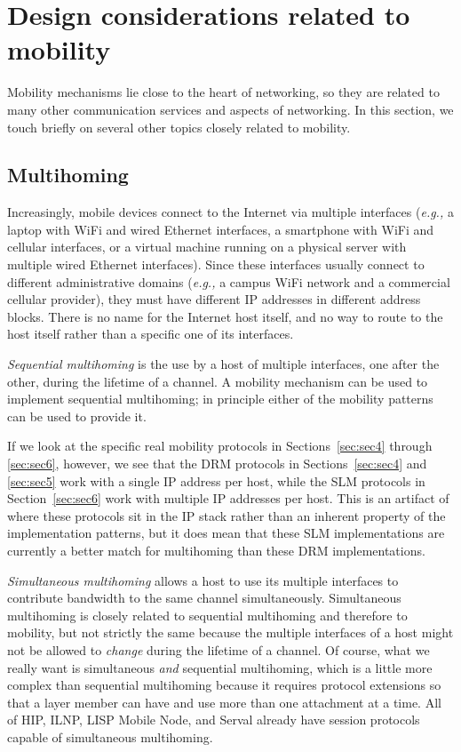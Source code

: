 \section{Design considerations related to mobility}
\label{sec:sec8}

Mobility mechanisms lie close to the heart of networking, so they are
related to many other communication services and aspects of
networking.  In this section, we touch briefly on several other topics
closely related to mobility.

\subsection{Multihoming}
\label{sec:multihoming}

Increasingly, mobile devices connect to the Internet
via multiple interfaces ({\it e.g.,}
a laptop with WiFi and wired Ethernet
interfaces, a smartphone with WiFi and cellular interfaces, or a
virtual machine running on a physical server with multiple wired
Ethernet interfaces).  
Since these interfaces usually connect to
different administrative domains ({\it e.g.,}
a campus WiFi network and a
commercial cellular provider), they must have different IP addresses in
different address blocks.
There is no name for the Internet host itself, and no way to
route to the host itself rather than a specific one of its interfaces.

{\it Sequential multihoming} is the use by a host of multiple
interfaces, one after the other, during the lifetime of a channel.
A mobility mechanism can be used to implement sequential multihoming;
in principle either of the mobility patterns
can be used to provide it.

If we look at the specific real mobility protocols 
in Sections~\ref{sec:sec4} through \ref{sec:sec6}, however,
we see that the DRM protocols in Sections~\ref{sec:sec4} and 
\ref{sec:sec5} work with a single IP address per host, while the
SLM protocols in Section~\ref{sec:sec6} work with multiple IP addresses
per host.
This is an artifact of where these protocols sit in the IP stack rather
than an inherent property of the implementation patterns,
but it does mean that these SLM implementations are currently a better
match for multihoming than these DRM implementations.

{\it Simultaneous multihoming} allows a host to use its multiple
interfaces to contribute bandwidth to the same channel simultaneously.
Simultaneous multihoming
is closely related to sequential multihoming and therefore
to mobility, but not strictly the same because the multiple
interfaces of a host might not be allowed to {\it change} during
the lifetime of a channel.
Of course, what we really want is simultaneous {\it and} sequential
multihoming, which is a
little more complex than sequential multihoming because it requires
protocol extensions so that a layer member can
have and use more than one attachment at a time. 
All of HIP, ILNP, LISP Mobile Node, and Serval
already have session protocols capable of simultaneous multihoming.

